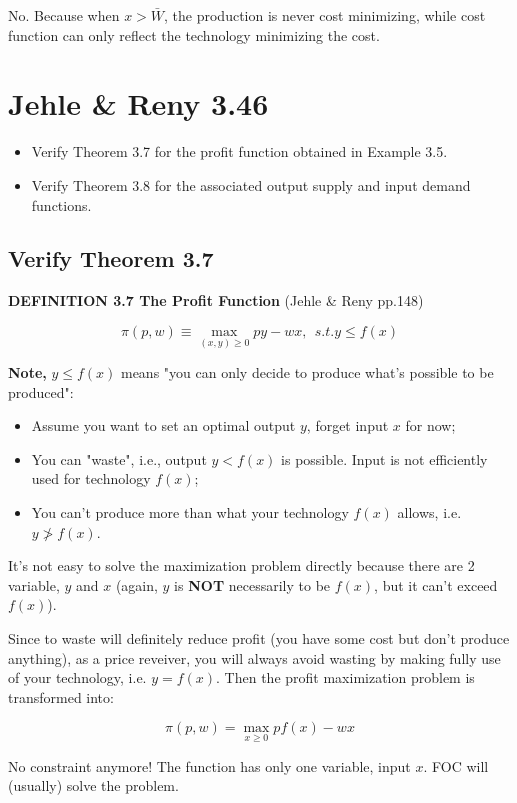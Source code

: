 \documentclass{article}
\begin{document}
No. Because when $x > \bar{W}$, the production is never cost minimizing, while  cost function can only reflect the technology minimizing the cost.

\section{Jehle \& Reny 3.46}

\begin{itemize}
\item Verify Theorem 3.7 for the profit function obtained in Example 3.5. 
\item Verify Theorem 3.8 for the associated output supply and input demand functions.
\end{itemize}
\subsection{Verify Theorem 3.7}

\begin{mdframed}[backgroundcolor=blue!20,linecolor=white]

\textbf{DEFINITION 3.7 The Profit Function} (Jehle \& Reny pp.148)

$$\pi (p,w) \equiv \max_{(x,y) \ge 0} py - wx, \ \ s.t. y \le f(x)$$

\textbf{Note,} $y \le f(x)$ means "you can only decide to produce what's possible to be produced":

\begin{itemize}
\item Assume you want to set an optimal output $y$, forget input $x$ for now;
\item You can "waste", i.e., output $y < f(x)$ is possible. Input is not efficiently used for technology $f(x)$;
\item You can't produce more than what your technology $f(x)$ allows, i.e.  $y \ngtr f(x)$.
\end{itemize}

It's not easy to solve the maximization problem directly because there are 2 variable, $y$ and $x$ (again, $y$ is \textbf{NOT} 
necessarily to be $f(x)$, but it can't exceed $f(x)$).

Since to waste will definitely reduce profit (you have some cost but don't produce anything), as a price reveiver, you will always avoid wasting by
making fully use of your technology, i.e. $y = f(x)$. Then the profit maximization problem is transformed into:

$$\pi (p,w) = \max_{x \ge 0} p f(x) - wx$$

No constraint anymore! The function has only one variable, input $x$. FOC will (usually) solve the problem.

\end{mdframed}
\end{document}
